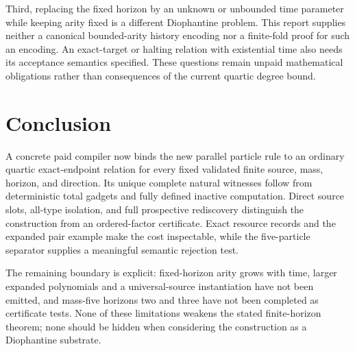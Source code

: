 \documentclass[11pt,a4paper]{article}
\numberwithin{equation}{section}
\begin{document}
Third, replacing the fixed horizon by an unknown or unbounded time parameter while keeping arity fixed is a different Diophantine problem. This report supplies neither a canonical bounded-arity history encoding nor a finite-fold proof for such an encoding. An exact-target or halting relation with existential time also needs its acceptance semantics specified. These questions remain unpaid mathematical obligations rather than consequences of the current quartic degree bound.

\section{Conclusion}
A concrete paid compiler now binds the new parallel particle rule to an ordinary quartic exact-endpoint relation for every fixed validated finite source, mass, horizon, and direction. Its unique complete natural witnesses follow from deterministic total gadgets and fully defined inactive computation. Direct source slots, all-type isolation, and full prospective rediscovery distinguish the construction from an ordered-factor certificate. Exact resource records and the expanded pair example make the cost inspectable, while the five-particle separator supplies a meaningful semantic rejection test.

The remaining boundary is explicit: fixed-horizon arity grows with time, larger expanded polynomials and a universal-source instantiation have not been emitted, and mass-five horizons two and three have not been completed as certificate tests. None of these limitations weakens the stated finite-horizon theorem; none should be hidden when considering the construction as a Diophantine substrate.
\end{document}
